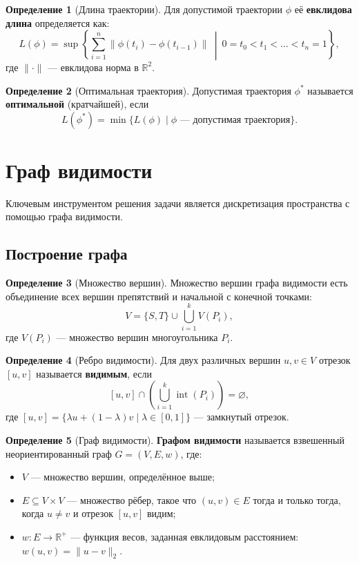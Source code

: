 \documentclass{article}
\theoremstyle{definition}
\newtheorem{definition}{Определение}
\begin{document}
\begin{definition}[Длина траектории]
Для допустимой траектории $\phi$ её \textbf{евклидова длина} определяется как:
\[
L(\phi) = \sup \left\{ \sum_{i=1}^{n} \|\phi(t_i) - \phi(t_{i-1})\| \ \middle| \ 0 = t_0 < t_1 < \dots < t_n = 1 \right\},
\]
где $\| \cdot \|$ --- евклидова норма в $\mathbb{R}^2$.
\end{definition}

\begin{definition}[Оптимальная траектория]
Допустимая траектория $\phi^*$ называется \textbf{оптимальной} (кратчайшей), если
\[
L(\phi^*) = \min \{ L(\phi) \mid \phi \text{ --- допустимая траектория} \}.
\]
\end{definition}

\section{Граф видимости}
\label{sec:visibility-graph}

Ключевым инструментом решения задачи является дискретизация пространства с помощью графа видимости.

\subsection{Построение графа}

\begin{definition}[Множество вершин]
Множество вершин графа видимости есть объединение всех вершин препятствий и начальной с конечной точками:
\[
V = \{S, T\} \cup \bigcup_{i=1}^k V(P_i),
\]
где $V(P_i)$ --- множество вершин многоугольника $P_i$.
\end{definition}

\begin{definition}[Ребро видимости]
Для двух различных вершин $u, v \in V$ отрезок $[u, v]$ называется \textbf{видимым}, если
\[
[u, v] \cap \left( \bigcup_{i=1}^k \operatorname{int}(P_i) \right) = \varnothing,
\]
где $[u, v] = \{\lambda u + (1-\lambda)v \mid \lambda \in [0, 1]\}$ --- замкнутый отрезок.
\end{definition}

\begin{definition}[Граф видимости]
\textbf{Графом видимости} называется взвешенный неориентированный граф $G = (V, E, w)$, где:
\begin{itemize}
    \item $V$ --- множество вершин, определённое выше;
    \item $E \subseteq V \times V$ --- множество рёбер, такое что $(u, v) \in E$ тогда и только тогда, когда $u \neq v$ и отрезок $[u, v]$ видим;
    \item $w: E \to \mathbb{R}^+$ --- функция весов, заданная евклидовым расстоянием: $w(u, v) = \|u - v\|_2$.
\end{itemize}
\end{definition}
\end{document}
